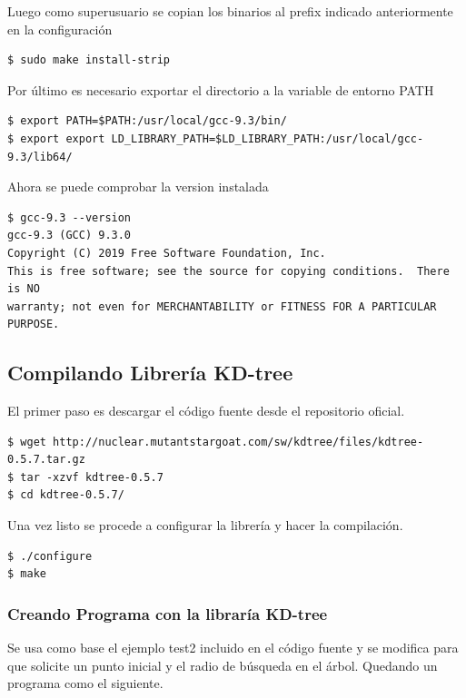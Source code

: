 \documentclass[12pt]{article}
\begin{document}
Luego como superusuario se copian los binarios al prefix indicado anteriormente en la configuración
\begin{lstlisting}[frame=single]
$ sudo make install-strip
\end{lstlisting}

Por último es necesario exportar el directorio a la variable de entorno PATH
\begin{lstlisting}[frame=single]
$ export PATH=$PATH:/usr/local/gcc-9.3/bin/
$ export export LD_LIBRARY_PATH=$LD_LIBRARY_PATH:/usr/local/gcc-9.3/lib64/
\end{lstlisting}

Ahora se puede comprobar la version instalada
\begin{lstlisting}[frame=single]
$ gcc-9.3 --version
gcc-9.3 (GCC) 9.3.0
Copyright (C) 2019 Free Software Foundation, Inc.
This is free software; see the source for copying conditions.  There is NO
warranty; not even for MERCHANTABILITY or FITNESS FOR A PARTICULAR PURPOSE.
\end{lstlisting}

\subsection{Compilando Librería KD-tree}

El primer paso es descargar el código fuente desde el repositorio oficial.
\begin{lstlisting}[frame=single]
$ wget http://nuclear.mutantstargoat.com/sw/kdtree/files/kdtree-0.5.7.tar.gz
$ tar -xzvf kdtree-0.5.7
$ cd kdtree-0.5.7/
\end{lstlisting}

Una vez listo se procede a configurar la librería y hacer la compilación.
\begin{lstlisting}[frame=single]
$ ./configure
$ make
\end{lstlisting}

\subsubsection{Creando Programa con la libraría KD-tree}

Se usa como base el ejemplo test2 incluido en el código fuente y se modifica para que solicite un punto inicial y el radio de búsqueda en el árbol. Quedando un programa como el siguiente.
\end{document}
